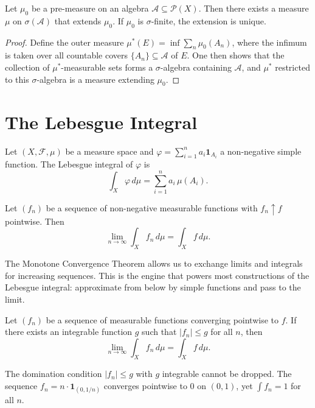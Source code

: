 \documentclass[11pt]{article}
\begin{document}
\begin{theorem}
Let $\mu_0$ be a pre-measure on an algebra $\mathcal{A} \subseteq \mathcal{P}(X)$. Then there exists a measure $\mu$ on $\sigma(\mathcal{A})$ that extends $\mu_0$. If $\mu_0$ is $\sigma$-finite, the extension is unique.
\end{theorem}

\begin{proof}
Define the outer measure $\mu^*(E) = \inf \sum_{n} \mu_0(A_n)$, where the infimum is taken over all countable covers $\{A_n\} \subseteq \mathcal{A}$ of $E$. One then shows that the collection of $\mu^*$-measurable sets forms a $\sigma$-algebra containing $\mathcal{A}$, and $\mu^*$ restricted to this $\sigma$-algebra is a measure extending $\mu_0$.
\end{proof}

\section{The Lebesgue Integral}

\begin{definition}
Let $(X, \mathcal{F}, \mu)$ be a measure space and $\varphi = \sum_{i=1}^n a_i \mathbf{1}_{A_i}$ a non-negative simple function. The Lebesgue integral of $\varphi$ is
\[
  \int_X \varphi \, d\mu = \sum_{i=1}^n a_i \, \mu(A_i).
\]
\end{definition}

\begin{theorem}
Let $(f_n)$ be a sequence of non-negative measurable functions with $f_n \uparrow f$ pointwise. Then
\[
  \lim_{n \to \infty} \int_X f_n \, d\mu = \int_X f \, d\mu.
\]
\end{theorem}

\begin{intuition}
The Monotone Convergence Theorem allows us to exchange limits and integrals for increasing sequences. This is the engine that powers most constructions of the Lebesgue integral: approximate from below by simple functions and pass to the limit.
\end{intuition}

\begin{theorem}
Let $(f_n)$ be a sequence of measurable functions converging pointwise to $f$. If there exists an integrable function $g$ such that $|f_n| \leq g$ for all $n$, then
\[
  \lim_{n \to \infty} \int_X f_n \, d\mu = \int_X f \, d\mu.
\]
\end{theorem}

\begin{remark}
The domination condition $|f_n| \leq g$ with $g$ integrable cannot be dropped. The sequence $f_n = n \cdot \mathbf{1}_{(0, 1/n)}$ converges pointwise to $0$ on $(0,1)$, yet $\int f_n = 1$ for all $n$.
\end{remark}
\end{document}
